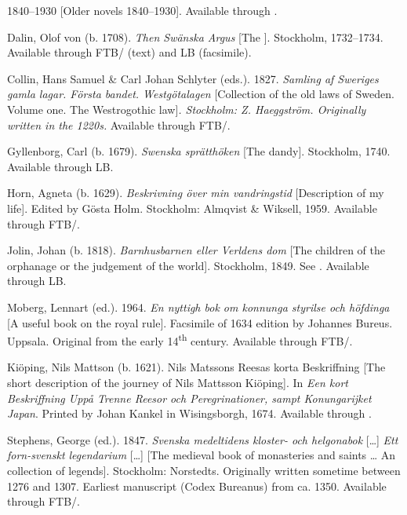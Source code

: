 \documentclass[output=paper]{langscibook}
\begin{document}
\begin{description}[font=\normalfont]\sloppy
\item[\textit{ÄSv}:]  1840–1930 [Older  novels 1840–1930]. Available through .
\item[\textit{Argus}:] Dalin, Olof von (b. 1708). \textit{Then Swänska Argus} [The  ]. Stockholm, 1732–1734. Available through FTB\slash {} (text) and LB (facsimile).
\item[\isi{EWL}:] Collin, Hans Samuel \& Carl Johan Schlyter (eds.). 1827. \emph{Samling af Sweriges gamla lagar. Första bandet. Westgötalagen} [Collection of the old laws of Sweden. Volume one. The Westrogothic law]\emph{. \textup{Stockholm: Z. Haeggström}. \textup{Originally written in the 1220s.} }Available through FTB\slash {}.
\item[Gyllenborg:] Gyllenborg, Carl (b. 1679). \textit{Swenska sprätthöken} [The  dandy]. Stockholm, 1740. Available through LB.
\item[Horn:] Horn, Agneta (b. 1629). \textit{Beskrivning över min vandringstid} [Description of my life]. Edited by Gösta Holm. Stockholm: Almqvist \& Wiksell, 1959. Available through FTB\slash {}.
\item[Jolin:] Jolin, Johan (b. 1818). \textit{Barnhusbarnen eller Verldens dom} [The children of the orphanage or the judgement of the world]. Stockholm, 1849. See \citet{MarttalaStromquist2001}. Available through LB.
\item[K-styr:] Moberg, Lennart (ed.). 1964. \textit{En nyttigh bok om konnunga styrilse och höfdinga} [A useful book on the royal rule]. Facsimile of 1634 edition by Johannes Bureus. Uppsala. Original from the early 14\textsuperscript{th} century. Available through FTB\slash {}.
\item[Kiöping:] Kiöping, Nils Mattson (b. 1621). Nils Matssons Reesas korta Beskriffning [The short description of the journey of Nils Mattsson Kiöping]. In \textit{Een kort Beskriffning Uppå Trenne Reesor och Peregrinationer, sampt Konungarijket Japan}. Printed by Johan Kankel in Wisingsborgh, 1674. Available through .
\item[Leg:] Stephens, George (ed.). 1847. \textit{Svenska medeltidens kloster- och helgonabok} […] \textit{Ett forn-svenskt legendarium} […] [The  medieval book of monasteries and saints … An  collection of legends]. Stockholm: Norstedts. Originally written sometime between 1276 and 1307. Earliest manuscript (Codex Bureanus) from ca. 1350. Available through FTB\slash {}.

\end{description}
\end{document}
